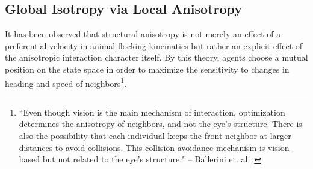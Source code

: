 \subsection{Global Isotropy via Local Anisotropy}
%
It has been observed that structural anisotropy is not merely an effect of a preferential velocity in animal flocking kinematics but rather an explicit effect of the anisotropic interaction character itself. By this theory, agents choose a mutual position on the state space in order to maximize the sensitivity to changes in heading and speed of neighbors\footnote{``Even though vision is the main mechanism of interaction, optimization determines the anisotropy of neighbors, and not the eye's structure. There is also the possibility that each individual keeps the front neighbor at larger distances to avoid collisions. This collision avoidance mechanism is vision-based but not related to the eye's structure." -- Ballerini et. al~\cite{Ballerini1232}.}.
 
